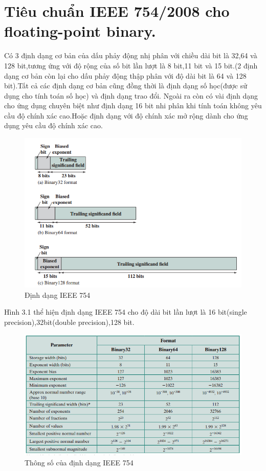 \documentclass[11pt,a4paper,vietnamese]{report}
\begin{document}
\section{Tiêu chuẩn IEEE 754/2008 cho floating-point binary.}
Có 3 định dạng cơ bản của dấu phảy động nhị phân với chiều dài bit là 32,64 và 128 bit,tương ứng với độ rộng của số bit lần lượt là 8 bit,11 bit và 15 bit.(2 định dạng cơ bản còn lại cho dấu phảy động thập phân với độ dài bit là 64 và 128 bit).Tất cả các định dạng cơ bản cũng đồng thời là định dạng số học(được sử dụng cho tính toán số học) và định dạng trao đổi.
Ngoài ra còn có vài định dạng cho ứng dụng chuyên biệt như định dạng 16 bit nhi phân khi tính toán không yêu cầu độ chính xác cao.Hoặc định dạng với độ chính xác mở rộng dành cho ứng dụng yêu cầu độ chính xác cao.
\begin{center}
    \begin{figure}[htp]
    \begin{center}
     \includegraphics[scale=.7]{image/fig3}
    \end{center}
    \caption{Định dạng IEEE 754}
    \label{reffig3}
    \end{figure}
\end{center}
Hình 3.1 thể hiện định dạng IEEE 754 cho độ dài bit lần lượt là 16 bit(single precision),32bit(double precision),128 bit.
\begin{center}
    \begin{figure}[htp]
    \begin{center}
     \includegraphics[scale=.7]{image/fig4}
    \end{center}
    \caption{Thông số của định dạng IEEE 754}
    \label{reffig4}
    \end{figure}
\end{center}
\end{document}

